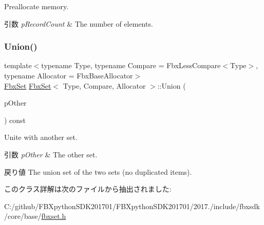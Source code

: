 Preallocate memory. 
\begin{DoxyParams}{引数}
{\em p\+Record\+Count} & The number of elements. \\
\hline
\end{DoxyParams}
\mbox{\label{class_fbx_set_a2a1a03dffe4d1b40a04bd48e4b6b3c10}} 
\subsubsection{\texorpdfstring{Union()}{Union()}}
{\footnotesize\ttfamily template$<$typename Type, typename Compare = Fbx\+Less\+Compare$<$\+Type$>$, typename Allocator = Fbx\+Base\+Allocator$>$ \\
\hyperlink{class_fbx_set}{Fbx\+Set} \hyperlink{class_fbx_set}{Fbx\+Set}$<$ Type, Compare, Allocator $>$\+::Union (\begin{DoxyParamCaption}\item[{const \hyperlink{class_fbx_set}{Fbx\+Set}$<$ Type, Compare, Allocator $>$ \&}]{p\+Other }\end{DoxyParamCaption}) const}

Unite with another set. 
\begin{DoxyParams}{引数}
{\em p\+Other} & The other set. \\
\hline
\end{DoxyParams}
\begin{DoxyReturn}{戻り値}
The union set of the two sets (no duplicated items). 
\end{DoxyReturn}


このクラス詳解は次のファイルから抽出されました\+:\begin{DoxyCompactItemize}
\item 
C\+:/github/\+F\+B\+Xpython\+S\+D\+K201701/\+F\+B\+Xpython\+S\+D\+K201701/2017./include/fbxsdk/core/base/\hyperlink{fbxset_8h}{fbxset.\+h}\end{DoxyCompactItemize}
